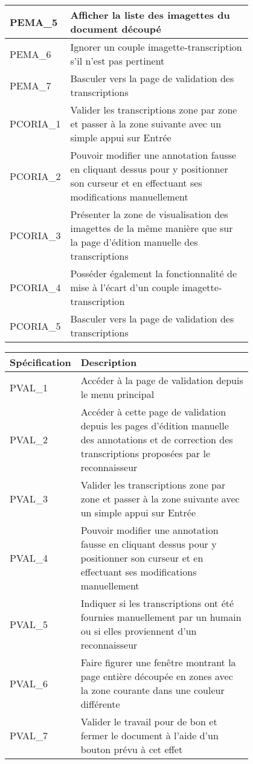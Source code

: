 \begin{center}
\begin{tabular}{ | l | p{0.8\linewidth} | }
        \hline
        PEMA\_5 & Afficher la liste des imagettes du document découpé \\
        \hline
        PEMA\_6 & Ignorer un couple imagette-transcription s’il n’est pas pertinent \\
        \hline
        PEMA\_7 & Basculer vers la page de validation des transcriptions \\
        \hline
        PCORIA\_1 & Valider les transcriptions zone par zone et passer à la zone suivante avec un simple appui sur Entrée \\
        \hline
        PCORIA\_2 & Pouvoir modifier une annotation fausse en cliquant dessus pour y positionner son curseur et en effectuant ses modifications manuellement \\
        \hline
        PCORIA\_3 & Présenter la zone de visualisation des imagettes de la même manière que sur la page d’édition manuelle des transcriptions \\
        \hline
        PCORIA\_4 & Posséder également la fonctionnalité de mise à l’écart d’un couple imagette-transcription \\
        \hline
        PCORIA\_5 & Basculer vers la page de validation des transcriptions \\
        \hline
    \end{tabular}

    \begin{tabular}{ | l | p{0.8\linewidth} | }
        \hline
        \textbf{Spécification} & \textbf{Description} \\
        \hline
        PVAL\_1 & Accéder à la page de validation depuis le menu principal \\
        \hline
        PVAL\_2 & Accéder à cette page de validation depuis les pages d’édition manuelle des annotations et de correction des transcriptions proposées par le reconnaisseur \\
        \hline
        PVAL\_3 & Valider les transcriptions zone par zone et passer à la zone suivante avec un simple appui sur Entrée \\
        \hline
        PVAL\_4 & Pouvoir modifier une annotation fausse en cliquant dessus pour y positionner son curseur et en effectuant ses modifications manuellement \\
        \hline
        PVAL\_5 & Indiquer si les transcriptions ont été fournies manuellement par un humain ou si elles proviennent d’un reconnaisseur \\
        \hline
        \rowcolor{red!30}PVAL\_6 & Faire figurer une fenêtre montrant la page entière découpée en zones avec la zone courante dans une couleur différente \\
        \hline
        PVAL\_7 & Valider le travail pour de bon et fermer le document à l’aide d’un bouton prévu à cet effet \\
        \hline
    \end{tabular}


\end{center}
